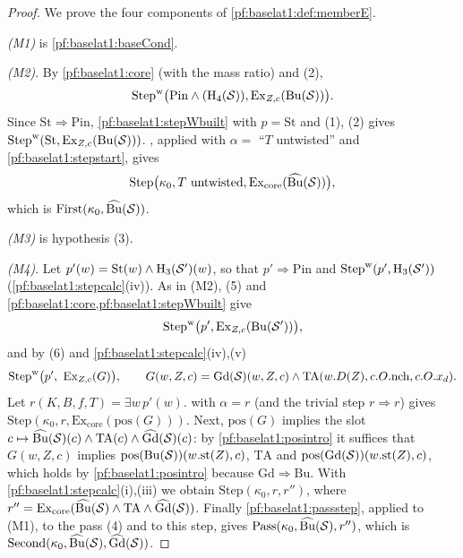 \begin{proof}
We prove the four components of \cref{pf:baselat1:def:memberE}.

\emph{(M1)} is \cref{pf:baselat1:baseCond}.

\emph{(M2)}. By \cref{pf:baselat1:core} (with the mass ratio) and (2),
\[\mathrm{Step}^{\mathrm w}\bigl(\mathrm{Pin}\wedge(\mathrm{H}_4(\mathcal S)),\mathrm{Ex}_{Z,c}(\mathrm{Bu}(\mathcal S))\bigr).\]
Since $\mathrm{St}\Rightarrow\mathrm{Pin}$, \cref{pf:baselat1:stepWbuilt} with $p=\mathrm{St}$ and (1),
(2) gives $\mathrm{Step}^{\mathrm w}(\mathrm{St},\mathrm{Ex}_{Z,c}(\mathrm{Bu}(\mathcal S)))$.
, applied with $\alpha=$ ``$T$ untwisted'' and \cref{pf:baselat1:stepstart},
gives
\[\mathrm{Step}\bigl(\kappa_0,T\text{ untwisted},\mathrm{Ex}_{\mathrm{core}}(\widehat{\mathrm{Bu}}(\mathcal S))\bigr),\]
which is $\mathrm{First}(\kappa_0,\widehat{\mathrm{Bu}}(\mathcal S))$.

\emph{(M3)} is hypothesis (3).

\emph{(M4)}. Let $p'(w)=\mathrm{St}(w)\wedge\mathrm{H}_3(\mathcal S')(w)$, so that $p'\Rightarrow
\mathrm{Pin}$ and $\mathrm{Step}^{\mathrm w}(p',\mathrm{H}_3(\mathcal S'))$ (\cref{pf:baselat1:stepcalc}(iv)). As in
(M2), (5) and \cref{pf:baselat1:core,pf:baselat1:stepWbuilt} give
\[\mathrm{Step}^{\mathrm w}\bigl(p',\mathrm{Ex}_{Z,c}(\mathrm{Bu}(\mathcal S'))\bigr),\]
and by (6) and \cref{pf:baselat1:stepcalc}(iv),(v)
\[
\mathrm{Step}^{\mathrm w}\bigl(p',\ \mathrm{Ex}_{Z,c}(G)\bigr),\qquad G(w,Z,c)=\mathrm{Gd}(\baselatoneS)(w,Z,c)\wedge
\mathrm{TA}(w.D(Z),c.O.\mathrm{nch},c.O.x_d).
\]
Let $r(K,B,f,T)=\exists w\,p'(w)$.  with $\alpha=r$ (and the trivial step
$r\Rightarrow r$) gives $\mathrm{Step}(\kappa_0,r,\mathrm{Ex}_{\mathrm{core}}(\mathrm{pos}(G)))$. Next,
$\mathrm{pos}(G)$ implies the slot $c\mapsto\widehat{\mathrm{Bu}}(\mathcal S)(c)\wedge\mathrm{TA}(c)
\wedge\widehat{\mathrm{Gd}}(\mathcal S)(c)$: by \cref{pf:baselat1:posintro} it suffices that $G(w,Z,c)$ implies
$\mathrm{pos}(\mathrm{Bu}(\mathcal S))(w.\mathrm{st}(Z),c)$, $\mathrm{TA}$ and
$\mathrm{pos}(\mathrm{Gd}(\mathcal S))(w.\mathrm{st}(Z),c)$, which holds by
\cref{pf:baselat1:posintro} because $\mathrm{Gd}\Rightarrow\mathrm{Bu}$. With
\cref{pf:baselat1:stepcalc}(i),(iii) we obtain $\mathrm{Step}(\kappa_0,r,r'')$, where $r''=\mathrm{Ex}_{\mathrm{core}}(
\widehat{\mathrm{Bu}}(\mathcal S)\wedge\mathrm{TA}\wedge\widehat{\mathrm{Gd}}(\mathcal S))$. Finally
\cref{pf:baselat1:passstep}, applied to (M1), to the pass (4) and to this step, gives
$\mathrm{Pass}(\kappa_0,\widehat{\mathrm{Bu}}(\mathcal S),r'')$, which is
$\mathrm{Second}(\kappa_0,\widehat{\mathrm{Bu}}(\mathcal S),\widehat{\mathrm{Gd}}(\mathcal S))$.
\end{proof}

